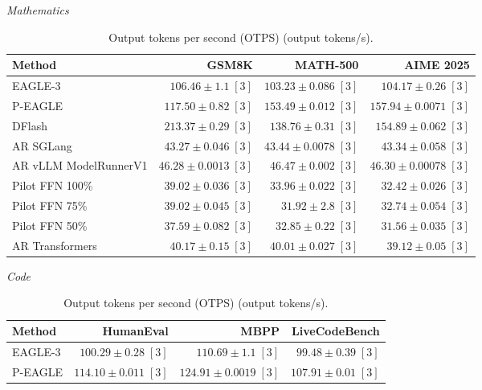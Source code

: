 \begin{table}[!tp]
\centering
\small
\setlength{\tabcolsep}{3pt}
\caption{Output tokens per second (OTPS) (output tokens/s).}
\label{tab:otps}
\textit{Mathematics}\par\smallskip
\begin{tabular}{@{}>{\raggedright\arraybackslash}p{3.7cm}rrr@{}}
\toprule
Method & GSM8K & MATH-500 & AIME 2025 \\
\midrule
EAGLE-3 & \(106.46 \pm 1.1\;[3]\) & \(103.23 \pm 0.086\;[3]\) & \(104.17 \pm 0.26\;[3]\) \\
P-EAGLE & \(117.50 \pm 0.82\;[3]\) & \(\mathbf{153.49} \pm 0.012\;[3]\) & \(\mathbf{157.94} \pm 0.0071\;[3]\) \\
DFlash & \(\mathbf{213.37} \pm 0.29\;[3]\) & \(138.76 \pm 0.31\;[3]\) & \(154.89 \pm 0.062\;[3]\) \\
AR \textperiodcentered{} SGLang & \(43.27 \pm 0.046\;[3]\) & \(43.44 \pm 0.0078\;[3]\) & \(43.34 \pm 0.058\;[3]\) \\
AR \textperiodcentered{} vLLM ModelRunnerV1 & \(46.28 \pm 0.0013\;[3]\) & \(46.47 \pm 0.002\;[3]\) & \(46.30 \pm 0.00078\;[3]\) \\
Pilot FFN 100\% & \(39.02 \pm 0.036\;[3]\) & \(33.96 \pm 0.022\;[3]\) & \(32.42 \pm 0.026\;[3]\) \\
Pilot FFN 75\% & \(39.02 \pm 0.045\;[3]\) & \(31.92 \pm 2.8\;[3]\) & \(32.74 \pm 0.054\;[3]\) \\
Pilot FFN 50\% & \(37.59 \pm 0.082\;[3]\) & \(32.85 \pm 0.22\;[3]\) & \(31.56 \pm 0.035\;[3]\) \\
AR \textperiodcentered{} Transformers & \(40.17 \pm 0.15\;[3]\) & \(40.01 \pm 0.027\;[3]\) & \(39.12 \pm 0.05\;[3]\) \\
\bottomrule
\end{tabular}
\par\medskip
\textit{Code}\par\smallskip
\begin{tabular}{@{}>{\raggedright\arraybackslash}p{3.7cm}rrr@{}}
\toprule
Method & HumanEval & MBPP & LiveCodeBench \\
\midrule
EAGLE-3 & \(100.29 \pm 0.28\;[3]\) & \(110.69 \pm 1.1\;[3]\) & \(99.48 \pm 0.39\;[3]\) \\
P-EAGLE & \(114.10 \pm 0.011\;[3]\) & \(124.91 \pm 0.0019\;[3]\) & \(107.91 \pm 0.01\;[3]\) \\

\end{tabular}
\end{table}
